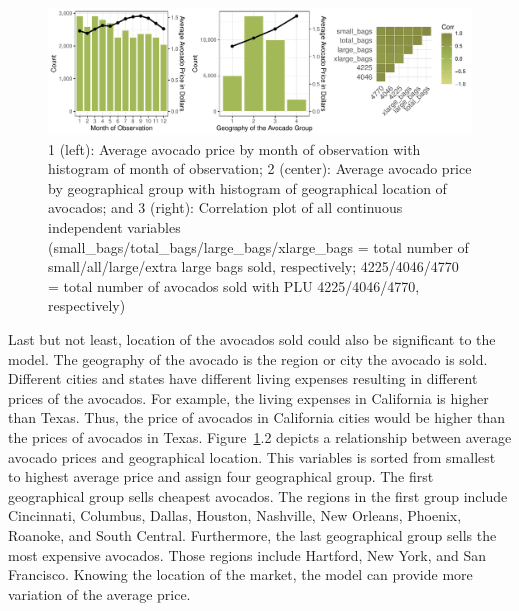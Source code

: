 \documentclass[11pt]{article}\usepackage[]{graphicx}\usepackage[]{color}
\makeatletter
\def\maxwidth{ %
  \ifdim\Gin@nat@width>\linewidth
    \linewidth
  \else
    \Gin@nat@width
  \fi
}
\makeatother
\begin{document}
\begin{figure}[h!] 
\begin{center}

\includegraphics[width=\maxwidth]{figure/unnamed-chunk-2-1} 

\caption{1 (left): Average avocado price by month of observation with histogram of month of observation; 2 (center): Average avocado price by geographical group with histogram of geographical location of avocados; and 3 (right): Correlation plot of all continuous independent variables (small\_bags/total\_bags/large\_bags/xlarge\_bags = total number of small/all/large/extra large bags sold, respectively; 4225/4046/4770 = total number of avocados sold with PLU 4225/4046/4770, respectively)}
\label{explore2}
\end{center} 
\end{figure}

\noindent Last but not least, location of the avocados sold could also be significant to the model. The geography of the avocado is the region or city the avocado is sold. Different cities and states have different living expenses resulting in different prices of the avocados. For example, the living expenses in California is higher than Texas. Thus, the price of avocados in California cities would be higher than the prices of avocados in Texas. Figure~\ref{explore2}.2 depicts a relationship between average avocado prices and geographical location. This variables is sorted from smallest to highest average price and assign four geographical group. The first geographical group sells cheapest avocados. The regions in the first group include Cincinnati, Columbus, Dallas, Houston, Nashville, New Orleans, Phoenix, Roanoke, and South Central. Furthermore, the last geographical group sells the most expensive avocados. Those regions include Hartford, New York, and San Francisco. Knowing the location of the market, the model can provide more variation of the average price.         
\hfill \break
\end{document}
